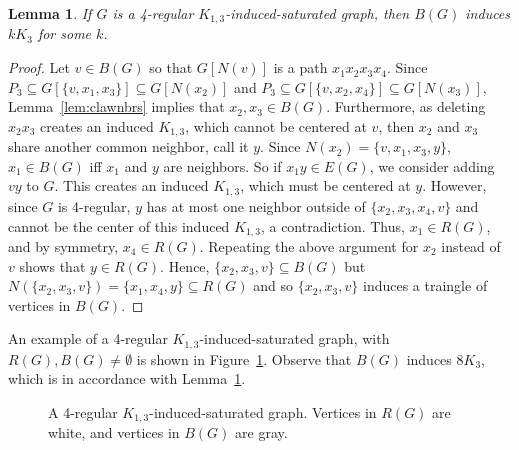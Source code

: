 \documentclass[12pt]{amsart}
\theoremstyle{plain}
\newtheorem{lem}[thm]{Lemma}
\theoremstyle{definition}
\theoremstyle{remark}
\newcommand{\claw}{\ensuremath{K_{1,3}}\xspace}
\begin{document}
{\begin{lem}\label{lem:bluetri}
If $G$ is a 4-regular \claw-induced-saturated graph, then $B(G)$ induces $kK_3$ for some $k$.
\end{lem}
\begin{proof}
Let $v \in B(G)$ so that $G[N(v)]$ is a path $x_1 x_2 x_3 x_4$.  Since $P_3\subseteq G[\{v,x_1,x_3\}]\subseteq G[N(x_2)]$ and $P_3\subseteq G[\{v,x_2,x_4\}]\subseteq G[N(x_3)]$, Lemma~\ref{lem:clawnbrs} implies that $x_2,x_3\in B(G)$.
Furthermore, as deleting $x_2x_3$ creates an induced \claw, which cannot be centered at $v$, then $x_2$ and $x_3$ share another common neighbor, call it $y$. Since $N(x_2) = \{v,x_1,x_3,y\}$,  $x_1 \in B(G)$ iff $x_1$ and $y$ are neighbors.  So if $x_1y \in E(G)$, we consider adding $vy$ to $G$.  This creates an induced \claw, which must be centered at $y$.  However, since $G$ is 4-regular, $y$ has at most one neighbor outside of $\{x_2,x_3,x_4,v\}$ and cannot be the center of this induced \claw, a contradiction.  Thus, $x_1 \in R(G)$, and by symmetry, $x_4 \in R(G)$.  Repeating the above argument for $x_2$ instead of $v$ shows that $y \in R(G)$.  Hence, $\{x_2,x_3, v\}\subseteq B(G)$ but $N(\{x_2,x_3, v\})=\{x_1,x_4,y\}\subseteq R(G)$ and so $\{x_2,x_3, v\}$ induces a traingle of vertices in $B(G)$.
\end{proof}

An example of a 4-regular \claw-induced-saturated graph, with $R(G),B(G)\neq\emptyset$ is shown in Figure~\ref{fig:claw pretty}.  Observe that $B(G)$ induces $8K_3$, which is in accordance with Lemma~\ref{lem:bluetri}.

\begin{figure}[ht]
\caption{A 4-regular \claw-induced-saturated graph. Vertices in $R(G)$ are white, and vertices in $B(G)$ are gray.}\label{fig:claw pretty}
\end{figure}


}
\end{document}
